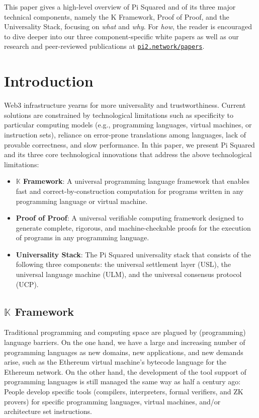 \documentclass{article}
\newcommand{\K}{\ensuremath{\mathbb{K}}\xspace}
\begin{document}
{This paper gives a high-level overview of Pi Squared and of its three major technical components, namely the K Framework, Proof of Proof, and the Universality Stack, focusing on {\em what} and {\em why}.  For {\em how}, the reader is encouraged to dive deeper into our three component-specific white papers as well as our research and peer-reviewed publications at 
\href{https://pi2.network/papers}{\texttt{pi2.network/papers}}.
}

\renewcommand{\contentsname}{Table of Contents}
\setcounter{tocdepth}{3}
\tableofcontents

\newpage

\section{Introduction}

Web3 infrastructure yearns for more universality and trustworthiness.
Current solutions are constrained by technological limitations 
such as specificity to particular computing models (e.g., programming languages, virtual machines, or instruction sets), reliance on error-prone translations among languages, lack of provable correctness, and slow performance.
In this paper, we present Pi Squared and its three core technological innovations
that address the above technological limitations:
\begin{itemize}
\item \textbf{\K Framework}: A universal programming language framework that enables fast and correct-by-construction computation for programs written in any programming language or virtual machine.
\item \textbf{Proof of Proof}: A universal verifiable computing framework designed to generate complete, rigorous, and machine-checkable proofs for the execution of programs in any programming language.
\item \textbf{Universality Stack}: The Pi Squared universality stack that
consists of the following three components: the universal settlement layer (USL),
the universal language machine (ULM), and the universal consensus protocol (UCP). 
\end{itemize}

\subsection{\K Framework}

Traditional programming and computing space are plagued by (programming) 
language barriers. 
On the one hand, we have a large and increasing number of programming languages as new
domains, new applications, and new demands arise,
such as the Ethereum virtual machine's bytecode language for the Ethereum network. 
On the other hand, the development of the tool support of programming languages
is still managed the same way as half a century ago: 
People develop specific tools 
(compilers, interpreters, formal verifiers, and ZK provers) 
for specific programming languages, 
virtual machines, and/or architecture set instructions. 
\end{document}

